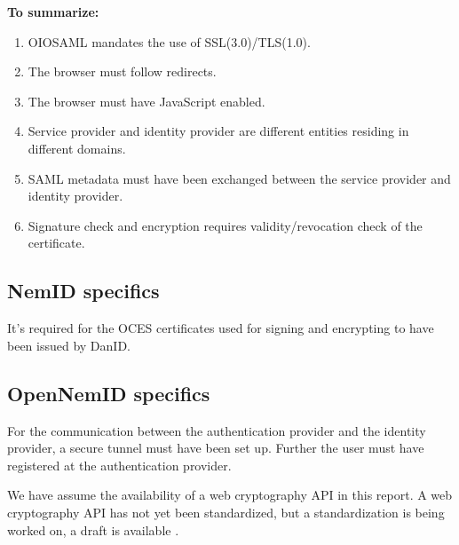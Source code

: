 \documentclass[twosided]{report}
\begin{document}
\textbf{To summarize:}
\begin{enumerate}
	\item OIOSAML mandates the use of SSL(3.0)/TLS(1.0).
	\item The browser must follow redirects.
	\item The browser must have JavaScript enabled.
	\item Service provider and identity provider are different entities residing in different domains.
	\item SAML metadata must have been exchanged between the service provider and identity provider.
	\item Signature check and encryption requires validity/revocation check of the certificate.
\end{enumerate}

\subsection{NemID specifics}
It's required for the OCES certificates used for signing and encrypting to have been issued by DanID.

\subsection{OpenNemID specifics}
For the communication between the authentication provider and the identity provider, a secure tunnel must have been set up. Further the user must have registered at the authentication provider.
\par
We have assume the availability of a web cryptography API in this report. A web cryptography API has not yet been standardized, but a standardization is being worked on, a draft is available \cite{webcrypto}. 
\end{document}
